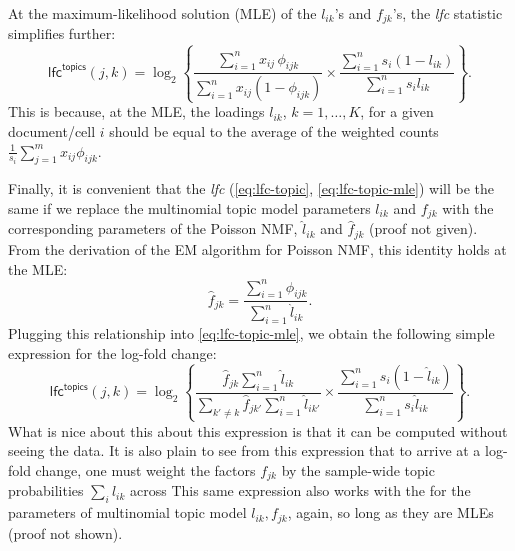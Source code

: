 \documentclass[final]{siamart171218}
\begin{document}
At the maximum-likelihood solution (MLE) of the $l_{ik}$'s and $f_{jk}$'s,
the {\em lfc} statistic simplifies further:
\begin{equation}
\mathsf{lfc}^{\mathsf{topics}}(j,k) = 
\log_2 \left\{ \frac{\sum_{i=1}^n x_{ij} \, \phi_{ijk}}
                    {\sum_{i=1}^n x_{ij} (1 - \phi_{ijk})} \times
               \frac{\sum_{i=1}^n s_i (1 - l_{ik})}
                    {\sum_{i=1}^n s_i l_{ik}} \right\}.
\label{eq:lfc-topic-mle}
\end{equation}
This is because, at the MLE, the loadings $l_{ik}$, $k = 1, \ldots,
K$, for a given document/cell $i$ should be equal to the average of
the weighted counts $\frac{1}{s_i} \sum_{j=1}^m x_{ij} \phi_{ijk}$. 

Finally, it is convenient that the {\em lfc} (\ref{eq:lfc-topic},
\ref{eq:lfc-topic-mle}) will be the same if we replace the multinomial
topic model parameters $l_{ik}$ and $f_{jk}$ with the corresponding
parameters of the Poisson NMF, $\hat{l}_{ik}$ and $\hat{f}_{jk}$
(proof not given). From the derivation of the EM algorithm for Poisson
NMF, this identity holds at the MLE:
\begin{equation*}
\hat{f}_{jk} = \frac{\sum_{i=1}^n \phi_{ijk}}{\sum_{i=1}^n \hat{l}_{ik}}.
\end{equation*}
Plugging this relationship into \eqref{eq:lfc-topic-mle}, we obtain
the following simple expression for the log-fold change:
\begin{equation}
\mathsf{lfc}^{\mathsf{topics}}(j,k) = 
\log_2 \left\{ 
\frac{\hat{f}_{jk} \sum_{i=1}^n \hat{l}_{ik}}
     {\sum_{k' \neq k} \hat{f}_{jk'} \sum_{i=1}^n \hat{l}_{ik'}} \times
\frac{\sum_{i=1}^n s_i (1 - \hat{l}_{ik})}
     {\sum_{i=1}^n s_i \hat{l}_{ik}} \right\}.
\label{eq:lfc-topic-mle-2}
\end{equation}
What is nice about this about this expression is that it can be
computed without seeing the data. It is also plain to see from this
expression that to arrive at a log-fold change, one must weight the
factors $f_{jk}$ by the sample-wide topic probabilities $\sum_i
l_{ik}$ across This same expression also works with the for the
parameters of multinomial topic model $l_{ik}, f_{jk}$, again, so long
as they are MLEs (proof not shown).



\end{document}
